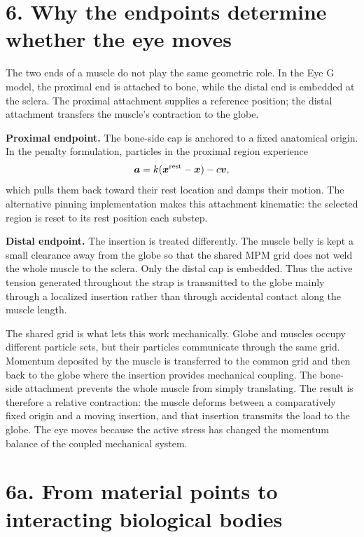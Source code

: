 \documentclass[11pt]{article}
\newcommand{\vect}[1]{\bm{#1}}
\begin{document}
\section*{6. Why the endpoints determine whether the eye moves}
The two ends of a muscle do not play the same geometric role. In the Eye G model, the proximal end is attached to bone, while the distal end is embedded at the sclera. The proximal attachment supplies a reference position; the distal attachment transfers the muscle's contraction to the globe.

\textbf{Proximal endpoint.} The bone-side cap is anchored to a fixed anatomical origin. In the penalty formulation, particles in the proximal region experience
\begin{equation}
\vect a=k(\vect x^{\rm rest}-\vect x)-c\vect v,
\label{eq:auto18}
\end{equation}
which pulls them back toward their rest location and damps their motion. The alternative pinning implementation makes this attachment kinematic: the selected region is reset to its rest position each substep.

\textbf{Distal endpoint.} The insertion is treated differently. The muscle belly is kept a small clearance away from the globe so that the shared MPM grid does not weld the whole muscle to the sclera. Only the distal cap is embedded. Thus the active tension generated throughout the strap is transmitted to the globe mainly through a localized insertion rather than through accidental contact along the muscle length.

The shared grid is what lets this work mechanically. Globe and muscles occupy different particle sets, but their particles communicate through the same grid. Momentum deposited by the muscle is transferred to the common grid and then back to the globe where the insertion provides mechanical coupling. The bone-side attachment prevents the whole muscle from simply translating. The result is therefore a relative contraction: the muscle deforms between a comparatively fixed origin and a moving insertion, and that insertion transmits the load to the globe. The eye moves because the active stress has changed the momentum balance of the coupled mechanical system.

\section*{6a. From material points to interacting biological bodies}
\end{document}
